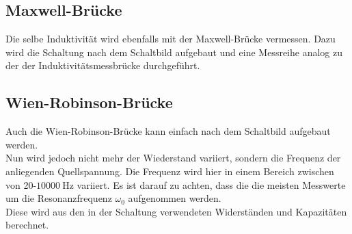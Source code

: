     \subsection{Maxwell-Brücke}

        \noindent Die  selbe Induktivität wird ebenfalls mit der Maxwell-Brücke vermessen. Dazu wird die Schaltung nach dem Schaltbild aufgebaut und 
        eine Messreihe analog zu der der Induktivitätsmessbrücke durchgeführt.

    \subsection{Wien-Robinson-Brücke}

        \noindent Auch die Wien-Robinson-Brücke kann einfach nach dem Schaltbild aufgebaut werden.\\ Nun wird jedoch nicht mehr der Wiederstand variiert, 
        sondern die Frequenz der anliegenden Quellspannung. Die Frequenz wird hier in einem Bereich zwischen von 20-$\SI{10000}{\hertz}$ variiert. Es ist 
        darauf zu achten, dass die die meisten Messwerte um die Resonanzfrequenz $\omega_0$ aufgenommen werden.\\ Diese wird aus den in der 
        Schaltung verwendeten Widerständen und Kapazitäten berechnet.

